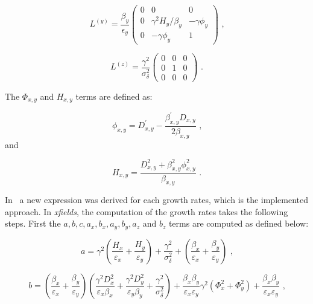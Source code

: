 \begin{equation}
    L^{(y)} = \frac{\beta_y}{\epsilon_y} \left(
        \begin{array}{ccc}
            0 & 0                      & 0 \\
            0 & \gamma^2 H_y / \beta_y & -\gamma \phi_y \\
            0 & -\gamma \phi_y         & 1
        \end{array} \right) \text{ ,}
\end{equation}

\begin{equation}
    L^{(z)} = \frac{\gamma^2}{\sigma_\delta^2} \left(
        \begin{array}{lll}
            0 & 0 & 0 \\
            0 & 1 & 0 \\
            0 & 0 & 0
        \end{array} \right) \text{ .}
\end{equation}

The \(\Phi_{x,y}\) and \(H_{x,y}\) terms are defined as:

\begin{equation}
    \phi_{x,y} = D_{x,y}^{\prime} - \frac{\beta_{x,y}^{\prime} D_{x,y}}{2 \beta_{x,y}} \text{ ,}
    \label{equation:bm_phi}
\end{equation}
and

\begin{equation}
    H_{x,y} = \frac{D_{x,y}^2 + \beta_{x,y}^2 \phi_{x,y}^2}{\beta_{x,y}} \text{ .}
    \label{equation:bm_h}
\end{equation}

In~\cite{CERN:Antoniou:Revision_IBS_MADX} a new expression was derived for each growth rates, which is the implemented approach.
In \textit{xfields}, the computation of the growth rates takes the following steps.
First the \(a, b, c, a_x, b_x, a_y, b_y, a_z\) and \(b_z\) terms are computed as defined below:

\begin{equation}
    a = \gamma^2 \left(\frac{H_x}{\varepsilon_x} + \frac{H_y}{\varepsilon_y}\right) + \frac{\gamma^2}{\sigma_{\delta}^{2}} + \left(\frac{\beta_x}{\varepsilon_x} + \frac{\beta_y}{\varepsilon_y} \right) \text{ ,}
    \label{equation:bm_a}
\end{equation}

\begin{equation}
    b = \left(\frac{\beta_x}{\varepsilon_x} + \frac{\beta_y}{\varepsilon_y}\right) \left(\frac{\gamma^2 D_x^{2}}{\varepsilon_x \beta_x} + \frac{\gamma^2 D_y^{2}}{\varepsilon_y \beta_y} + \frac{\gamma^2}{\sigma_{\delta}^{2}}\right) + \frac{\beta_x \beta_y}{\varepsilon_x \varepsilon_y} \gamma^2 \left( \Phi_x^{2} + \Phi_y^{2}\right) + \frac{\beta_x \beta_y}{\varepsilon_x \varepsilon_y} \text{ ,}
    \label{equation:bm_b}
\end{equation}

